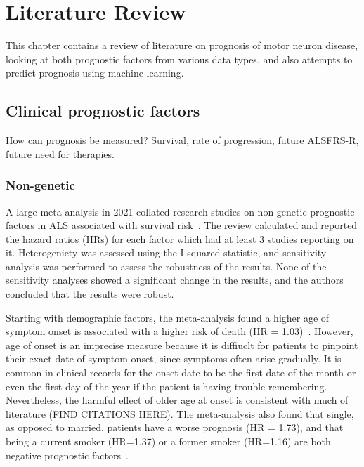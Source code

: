 \chapter{Literature Review}
\label{literature_review}

This chapter contains a review of literature on prognosis of motor neuron disease, looking at both prognostic factors from various data types, and also attempts to predict prognosis using machine learning.

\section{Clinical prognostic factors}

How can prognosis be measured? Survival, rate of progression, future ALSFRS-R, future need for therapies.

\subsection{Non-genetic}

A large meta-analysis in 2021 collated research studies on non-genetic prognostic factors in ALS associated with survival risk~\cite{suPredictorsSurvivalPatients2021}.
The review calculated and reported the hazard ratios (HRs) for each factor which had at least 3 studies reporting on it. Heterogeniety was assessed using the I-squared statistic, and sensitivity analysis was performed to assess the robustness of the results.
None of the sensitivity analyses showed a significant change in the results, and the authors concluded that the results were robust.

Starting with demographic factors, the meta-analysis found a higher age of symptom onset is associated with a higher risk of death (HR = 1.03)~\cite{suPredictorsSurvivalPatients2021}. However, age of onset is an imprecise measure because it is diffiuclt for patients to pinpoint their exact date of symptom onset, since symptoms often arise gradually.
It is common in clinical records for the onset date to be the first date of the month or even the first day of the year if the patient is having trouble remembering. Nevertheless, the harmful effect of older age at onset is consistent with much of literature (FIND CITATIONS HERE).
The meta-analysis also found that single, as opposed to married, patients have a worse prognosis (HR = 1.73), and that being a current smoker (HR=1.37) or a former smoker (HR=1.16) are both negative prognostic factors~\cite{suPredictorsSurvivalPatients2021}.

